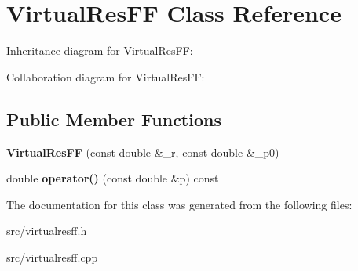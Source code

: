 \hypertarget{class_virtual_res_f_f}{}\section{Virtual\+Res\+F\+F Class Reference}
\label{class_virtual_res_f_f}


Inheritance diagram for Virtual\+Res\+F\+F\+:


Collaboration diagram for Virtual\+Res\+F\+F\+:
\subsection*{Public Member Functions}
\begin{DoxyCompactItemize}
\item 
\hypertarget{class_virtual_res_f_f_a51994d54e62480334df4ce686c670cef}{}{\bfseries Virtual\+Res\+F\+F} (const double \&\+\_\+r, const double \&\+\_\+p0)\label{class_virtual_res_f_f_a51994d54e62480334df4ce686c670cef}

\item 
\hypertarget{class_virtual_res_f_f_a819e7a5557c2b04c97a156ddae6b57af}{}double {\bfseries operator()} (const double \&p) const \label{class_virtual_res_f_f_a819e7a5557c2b04c97a156ddae6b57af}

\end{DoxyCompactItemize}


The documentation for this class was generated from the following files\+:\begin{DoxyCompactItemize}
\item 
src/virtualresff.\+h\item 
src/virtualresff.\+cpp\end{DoxyCompactItemize}
